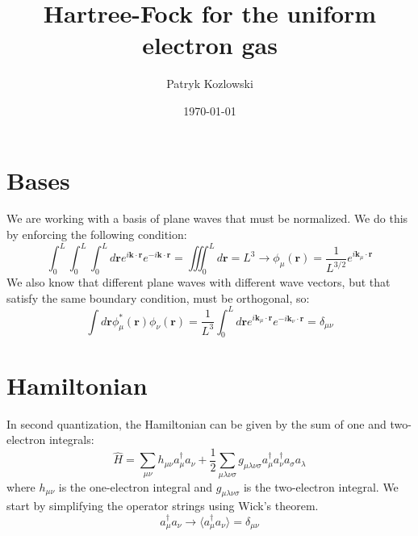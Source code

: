 \documentclass[12pt]{article}
\author{Patryk Kozlowski}
\title{Hartree-Fock for the uniform electron gas}
\date{\today}
\begin{document}
\maketitle
\section{Bases}
We are working with a basis of plane waves that must be normalized. We do this by enforcing the following condition:
\begin{equation}
    \int_0^L \int_0^L \int_0^L d\mathbf{r} e^{i\mathbf{k}\cdot\mathbf{r}} e^{-i\mathbf{k}\cdot\mathbf{r}} = \iiint_0^L d\mathbf{r} = L^3 \rightarrow \phi_\mu(\mathbf{r}) = \frac{1}{L^{3/2}} e^{i\mathbf{k}_\mu\cdot\mathbf{r}}
\end{equation}
We also know that different plane waves with different wave vectors, but that satisfy the same boundary condition, must be orthogonal, so:
\begin{equation}
    \int d\mathbf{r} \phi^*_\mu(\mathbf{r}) \phi_\nu(\mathbf{r}) = \frac{1}{L^3} \int_0^L d\mathbf{r} e^{i\mathbf{k}_\mu\cdot\mathbf{r}} e^{-i\mathbf{k}_\nu\cdot\mathbf{r}} = \delta_{\mu\nu}
\end{equation}
\section{Hamiltonian}
In second quantization, the Hamiltonian can be given by the sum of one and two-electron integrals:
\begin{equation}
    \hat{H} = \sum_{\mu\nu} h_{\mu\nu} a^\dagger_\mu a_\nu + \frac{1}{2} \sum_{\mu\lambda\nu\sigma} g_{\mu\lambda\nu\sigma} a^\dagger_\mu a^\dagger_\nu a_\sigma a_\lambda
\end{equation}
where $h_{\mu\nu}$ is the one-electron integral and $g_{\mu\lambda\nu\sigma}$ is the two-electron integral. We start by simplifying the operator strings using Wick's theorem. 
\begin{equation}
   a^\dagger_\mu a_\nu \rightarrow \langle a^\dagger_\mu a_\nu \rangle = \delta_{\mu\nu}
\end{equation}
\end{document}
